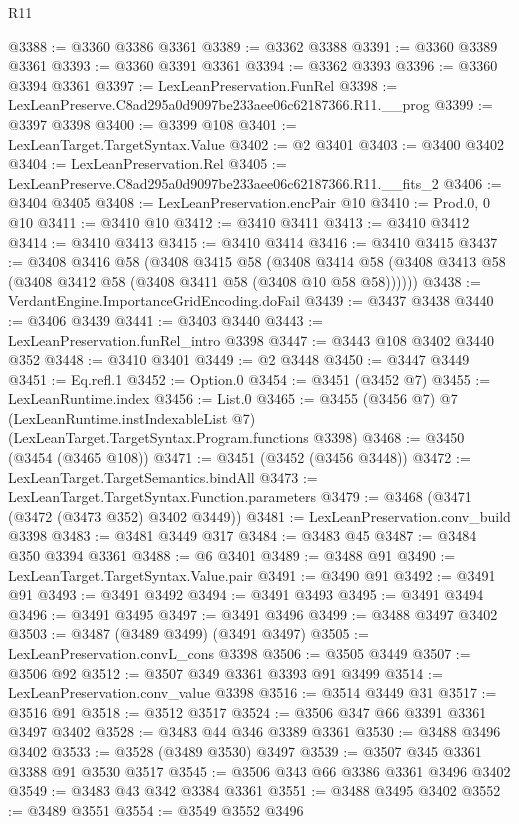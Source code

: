 \begin{lexlean}{R11}
\begin{coremodule}
@3388 := @3360 @3386 @3361
@3389 := @3362 @3388
@3391 := @3360 @3389 @3361
@3393 := @3360 @3391 @3361
@3394 := @3362 @3393
@3396 := @3360 @3394 @3361
@3397 := LexLeanPreservation.FunRel
@3398 := LexLeanPreserve.C8ad295a0d9097be233aee06c62187366.R11.__prog
@3399 := @3397 @3398
@3400 := @3399 @108
@3401 := LexLeanTarget.TargetSyntax.Value
@3402 := @2 @3401
@3403 := @3400 @3402
@3404 := LexLeanPreservation.Rel
@3405 := LexLeanPreserve.C8ad295a0d9097be233aee06c62187366.R11.__fits_2
@3406 := @3404 @3405
@3408 := LexLeanPreservation.encPair @10
@3410 := Prod.{0, 0} @10
@3411 := @3410 @10
@3412 := @3410 @3411
@3413 := @3410 @3412
@3414 := @3410 @3413
@3415 := @3410 @3414
@3416 := @3410 @3415
@3437 := @3408
    @3416
    @58
    (@3408
      @3415
      @58
      (@3408 @3414 @58 (@3408 @3413 @58 (@3408 @3412 @58 (@3408 @3411 @58 (@3408 @10 @58 @58))))))
@3438 := VerdantEngine.ImportanceGridEncoding.doFail
@3439 := @3437 @3438
@3440 := @3406 @3439
@3441 := @3403 @3440
@3443 := LexLeanPreservation.funRel_intro @3398
@3447 := @3443 @108 @3402 @3440 @352
@3448 := @3410 @3401
@3449 := @2 @3448
@3450 := @3447 @3449
@3451 := Eq.refl.{1}
@3452 := Option.{0}
@3454 := @3451 (@3452 @7)
@3455 := LexLeanRuntime.index
@3456 := List.{0}
@3465 := @3455
    (@3456 @7)
    @7
    (LexLeanRuntime.instIndexableList @7)
    (LexLeanTarget.TargetSyntax.Program.functions @3398)
@3468 := @3450 (@3454 (@3465 @108))
@3471 := @3451 (@3452 (@3456 @3448))
@3472 := LexLeanTarget.TargetSemantics.bindAll
@3473 := LexLeanTarget.TargetSyntax.Function.parameters
@3479 := @3468 (@3471 (@3472 (@3473 @352) @3402 @3449))
@3481 := LexLeanPreservation.conv_build @3398
@3483 := @3481 @3449 @317
@3484 := @3483 @45
@3487 := @3484 @350 @3394 @3361
@3488 := @6 @3401
@3489 := @3488 @91
@3490 := LexLeanTarget.TargetSyntax.Value.pair
@3491 := @3490 @91
@3492 := @3491 @91
@3493 := @3491 @3492
@3494 := @3491 @3493
@3495 := @3491 @3494
@3496 := @3491 @3495
@3497 := @3491 @3496
@3499 := @3488 @3497 @3402
@3503 := @3487 (@3489 @3499) (@3491 @3497)
@3505 := LexLeanPreservation.convL_cons @3398
@3506 := @3505 @3449
@3507 := @3506 @92
@3512 := @3507 @349 @3361 @3393 @91 @3499
@3514 := LexLeanPreservation.conv_value @3398
@3516 := @3514 @3449 @31
@3517 := @3516 @91
@3518 := @3512 @3517
@3524 := @3506 @347 @66 @3391 @3361 @3497 @3402
@3528 := @3483 @44 @346 @3389 @3361
@3530 := @3488 @3496 @3402
@3533 := @3528 (@3489 @3530) @3497
@3539 := @3507 @345 @3361 @3388 @91 @3530 @3517
@3545 := @3506 @343 @66 @3386 @3361 @3496 @3402
@3549 := @3483 @43 @342 @3384 @3361
@3551 := @3488 @3495 @3402
@3552 := @3489 @3551
@3554 := @3549 @3552 @3496

\end{coremodule}
\end{lexlean}
